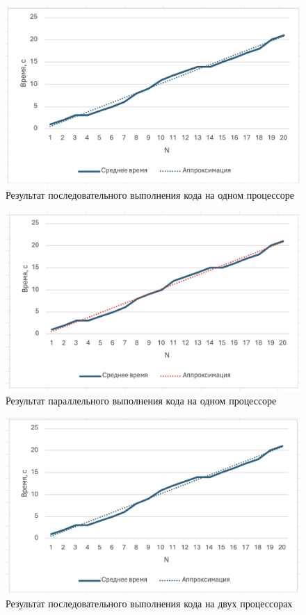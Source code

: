 \documentclass{article}
\begin{document}
\begin{figure}[H]
\centering
\includegraphics[width=1\textwidth]{images/17.png}
\caption{Результат последовательного выполнения кода на одном процессоре}
\end{figure}

\begin{figure}[H]
\centering
\includegraphics[width=1\textwidth]{images/18.png}
\caption{Результат параллельного выполнения кода на одном процессоре}
\end{figure}

\begin{figure}[H]
\centering
\includegraphics[width=1\textwidth]{images/19.png}
\caption{Результат последовательного выполнения кода на двух процессорах}
\end{figure}
\end{document}
